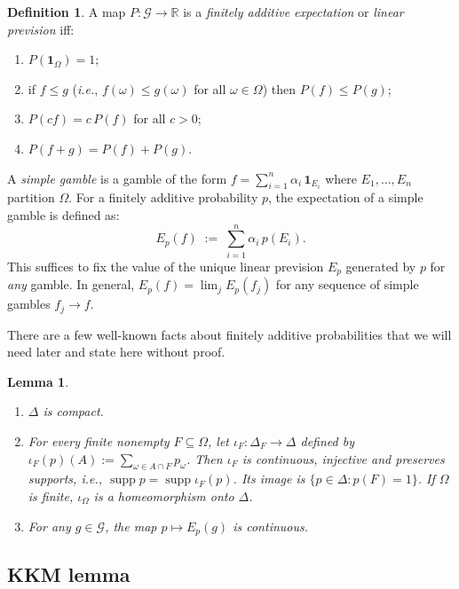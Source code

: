 \documentclass[11pt]{article}
\newtheorem{lemma}[theorem]{Lemma}
\theoremstyle{definition}
\newtheorem{definition}[theorem]{Definition}
\theoremstyle{remark}
\newcommand{\G}{\mathcal G}
\newcommand{\supp}{\operatorname{supp}}
\begin{document}
\begin{definition}\label{def:finitely-additive-expectation}
A map $P\colon\G\to\mathbb R$ is a \textit{finitely additive expectation} or \textit{linear prevision} iff:
\begin{enumerate}[label=\textup{(LNP\arabic*)}]
  \item $P(\mathbf{1}_\Omega)=1$;
  \item if $f\leq g$ (\textit{i.e.}, $f(\omega)\leq g(\omega)$ for all $\omega\in\Omega$) then $P(f)\leq P(g)$;
  \item $P(cf)=c\,P(f)$ for all $c>0$;
  \item $P(f+g)=P(f)+P(g)$.
\end{enumerate}
\end{definition}

A \emph{simple gamble} is a gamble of the form $f=\sum_{i=1}^{n}\alpha_i\,\mathbf{1}_{E_i}$ where $E_1,\ldots,E_n$ partition $\Omega$. For a finitely additive probability $p$, the expectation of a simple gamble is defined as:
\[
  E_p(f) \;:=\; \sum_{i=1}^{n}\alpha_i\,p(E_i).
\]
This suffices to fix the value of the unique linear prevision $E_p$ generated by $p$ for \textit{any} gamble. In general, $E_p(f)=\lim_jE_p(f_j)$ for any sequence of simple gambles $f_j\to f$.


There are a few well-known facts about finitely additive probabilities that we will need later and state here without proof.


\begin{lemma}\label{lem:prob}
\leavevmode
\begin{enumerate}[label=(\alph*)]
\item $\Delta$ is compact.
\item For every finite nonempty $F\subseteq\Omega$, let $\iota_F:\Delta_F\to\Delta$ defined by $\iota_F(p)(A):=\sum_{\omega\in A\cap F}p_\omega$. Then $\iota_F$ is continuous, injective and preserves supports, \textit{i.e.}, $\supp p = \supp \iota_F(p)$. Its image is $\{p\in\Delta:p(F)=1\}$. If $\Omega$ is finite, $\iota_\Omega$ is a homeomorphism onto $\Delta$.
\item For any $g\in\G$, the map $p\mapsto E_p(g)$ is continuous. 
\end{enumerate}
\end{lemma}



\subsection{KKM lemma}\label{sec:kkm}
\end{document}
